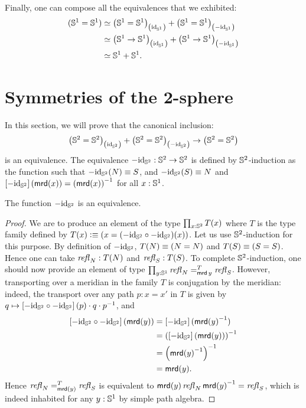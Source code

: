 \documentclass[english,a4]{article}
\renewcommand{\ap}[1]{\left[{#1}\right]}
\begin{document}
Finally, one can compose all the equivalences that we exhibited:
\begin{align*}
  ({{\mathbb S^{1}}}={{\mathbb S^{1}}})
  & \simeq {\left({{\mathbb S^{1}}}= {{\mathbb S^{1}}}\right)}_{\left(\mathord{\mathrm{id}}_{{\mathbb S^{1}}}\right)}
    + {\left({{\mathbb S^{1}}} = {{\mathbb S^{1}}}\right)}_{\left(-\mathord{\mathrm{id}}_{{\mathbb S^{1}}}\right)}
  \\
  & \simeq {\left({{\mathbb S^{1}}}\to {{\mathbb S^{1}}}\right)}_{\left(\mathord{\mathrm{id}}_{{\mathbb S^{1}}}\right)}
    + {\left({{\mathbb S^{1}}} \to {{\mathbb S^{1}}}\right)}_{\left(-\mathord{\mathrm{id}}_{{\mathbb S^{1}}}\right)}
  \\
  & \simeq {{\mathbb S^{1}}} + {{\mathbb S^{1}}}.
\end{align*}

\section{Symmetries of the $\boldsymbol 2$-sphere}
\label{sec:sphere}

In this section, we will prove that the canonical inclusion:
\begin{equation}
  \label{eq:goal-section-sphere}
  {\left({{\mathbb S^{2}}}= {{\mathbb S^{2}}}\right)}_{\left(\mathord{\mathrm{id}}_{{\mathbb S^{2}}}\right)} +
  {\left({{\mathbb S^{2}}} = {{\mathbb S^{2}}}\right)}_{\left(-\mathord{\mathrm{id}}_{{\mathbb S^{2}}}\right)}
  \to 
  \left({{\mathbb S^{2}}} = {{\mathbb S^{2}}}\right)
\end{equation}
is an equivalence. The equivalence $-\mathord{\mathrm{id}}_{{\mathbb S^{2}}} : {{\mathbb S^{2}}} \to {{\mathbb S^{2}}}$ is
defined by ${{\mathbb S^{2}}}$-induction as the function such that
$-\mathord{\mathrm{id}}_{{\mathbb S^{2}}}(N) \equiv S$, and $-\mathord{\mathrm{id}}_{{\mathbb S^{2}}}(S) \equiv N$ and
$\ap{-\id_\Sp}(\mrd(x)) = \inv{(\mrd(x))}$ for all $x:{{\mathbb S^{1}}}$. 

\begin{lemma}
  The function $-\mathord{\mathrm{id}}_{{\mathbb S^{2}}}$ is an equivalence.
  \label{lem:minus-id-equivalence}
\end{lemma}
\begin{proof}
  We are to produce an element of the type $\prod_{x:{{\mathbb S^{2}}}}T(x)$ where $T$ is the
  type family defined by $T(x)\vcentcolon\equiv (x= (-\mathord{\mathrm{id}}_{{\mathbb S^{2}}} \circ -\mathord{\mathrm{id}}_{{\mathbb S^{2}}})(x))$. Let us
  use ${{\mathbb S^{2}}}$-induction for this purpose. By definition of $-\mathord{\mathrm{id}}_{{\mathbb S^{2}}}$, $T(N)
  \equiv (N=N)$ and $T(S) \equiv (S=S)$. Hence one can take $\mathop{{\mathit{refl}}_{N}}:T(N)$ and $\mathop{{\mathit{refl}}_{S}}:T(S)$. To complete ${{\mathbb S^{2}}}$-induction, one should now provide an element of
  type $\prod_{y:{{\mathbb S^{1}}}} \mathop{{\mathit{refl}}_{N}} =^{T}_{\operatorname{\mathsf{mrd}} y} \mathop{{\mathit{refl}}_{S}}$. However,
  transporting over a meridian in the family $T$ is conjugation by the
  meridian: indeed, the transport over any path $p:x=x'$ in $T$ is given by
  $q\mapsto \ap{-\id_\Sp \circ -\id_\Sp}(p) \cdot q \cdot \inv p$, and
  \begin{align*}
    \ap{-\id_\Sp \circ -\id_\Sp} (\mrd(y)) 
     &= \ap{-\id_\Sp}(\inv {\mrd(y)}) 
    \\ &= \inv {\left( \ap{-\id_\Sp}(\mrd(y)) \right)} 
    \\ &= \inv { \left( \inv{\mrd(y)} \right) }
    \\ &= \mrd(y).
  \end{align*}
  Hence $\mathop{{\mathit{refl}}_{N}} =^{T}_{\operatorname{\mathsf{mrd}}(y)} \mathop{{\mathit{refl}}_{S}}$ is equivalent to
  $\operatorname{\mathsf{mrd}}(y)\mathop{{\mathit{refl}}_{N}} {\operatorname{\mathsf{mrd}}(y)}^{-1} = \mathop{{\mathit{refl}}_{S}}$, which is indeed inhabited for any
  $y:{{\mathbb S^{1}}}$ by simple path algebra.
\end{proof}
\end{document}
